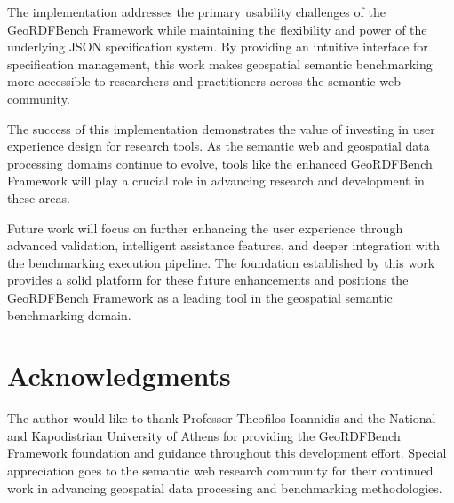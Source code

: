 \documentclass[11pt,a4paper]{article}
\begin{document}
The implementation addresses the primary usability challenges of the GeoRDFBench Framework while maintaining the flexibility and power of the underlying JSON specification system. By providing an intuitive interface for specification management, this work makes geospatial semantic benchmarking more accessible to researchers and practitioners across the semantic web community.

The success of this implementation demonstrates the value of investing in user experience design for research tools. As the semantic web and geospatial data processing domains continue to evolve, tools like the enhanced GeoRDFBench Framework will play a crucial role in advancing research and development in these areas.

Future work will focus on further enhancing the user experience through advanced validation, intelligent assistance features, and deeper integration with the benchmarking execution pipeline. The foundation established by this work provides a solid platform for these future enhancements and positions the GeoRDFBench Framework as a leading tool in the geospatial semantic benchmarking domain.

\section*{Acknowledgments}

The author would like to thank Professor Theofilos Ioannidis and the National and Kapodistrian University of Athens for providing the GeoRDFBench Framework foundation and guidance throughout this development effort. Special appreciation goes to the semantic web research community for their continued work in advancing geospatial data processing and benchmarking methodologies.
\end{document}
